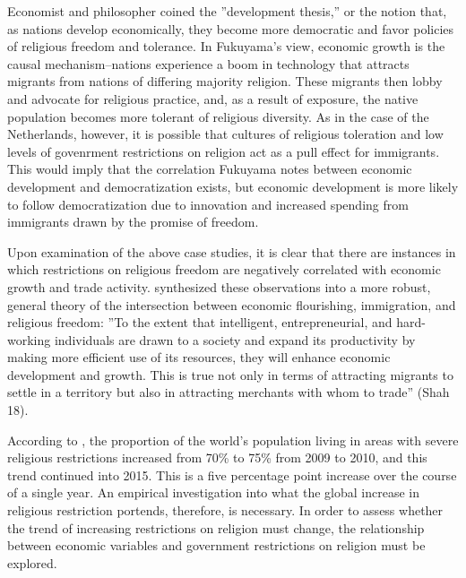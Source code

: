 \documentclass[12pt,english]{article}
\begin{document}
Economist and philosopher \citet{Fukuyama} coined the ''development thesis,'' or the notion that, as nations develop economically, they become more democratic and favor policies of religious freedom and tolerance. In Fukuyama's view, economic growth is the causal mechanism--nations experience a boom in technology that attracts migrants from nations of differing majority religion. These migrants then lobby and advocate for religious practice, and, as a result of exposure, the native population becomes more tolerant of religious diversity. As in the case of the Netherlands, however, it is possible that cultures of religious toleration and low levels of govenrment restrictions on religion act as a pull effect for immigrants. This would imply that the correlation Fukuyama notes between economic development and democratization exists, but economic development is more likely to follow democratization due to innovation and increased spending from immigrants drawn by the promise of freedom.

Upon examination of the above case studies, it is clear that there are instances in which restrictions on religious freedom are negatively correlated with economic growth and trade activity. \citet{Shah} synthesized these observations into a more robust, general theory of the intersection between economic flourishing, immigration, and religious freedom: ''To the extent that intelligent, entrepreneurial, and hard-working individuals are drawn to a society and expand its productivity by making more efficient use of its resources, they will enhance economic development and growth. This is true not only in terms of attracting migrants to settle in a territory but also in attracting merchants with whom to trade'' (Shah 18).

According to \citet{Pew}, the proportion of the world’s population living in areas with severe religious restrictions increased from 70\% to 75\% from 2009 to 2010, and this trend continued into 2015. This is a five percentage point increase over the course of a single year. An empirical investigation into what the global increase in religious restriction portends, therefore, is necessary. In order to assess whether the trend of increasing restrictions on religion must change, the relationship between economic variables and government restrictions on religion must be explored.
\end{document}
